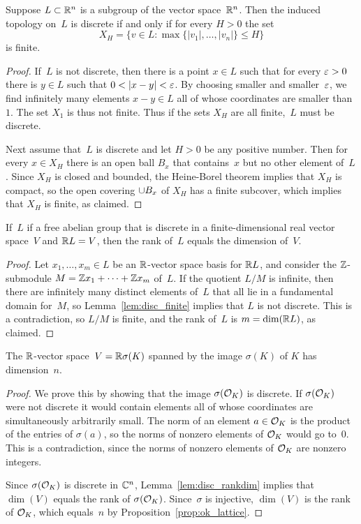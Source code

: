 \begin{lemma}\label{lem:disc_finite}
Suppose $L\subset \mathbb{R}^n$ is a subgroup of the vector space~$\mathbb{R}^n$.
Then the induced topology on~$L$ is discrete if and only
if for every  $H>0$ the set
$$
  X_H = \{v \in L : \max\{|v_1|,\ldots, |v_n|\} \leq H \}
$$
is finite.
\end{lemma}
\begin{proof}
If~$L$ is not discrete, then there is a point $x \in L$ such that
for every $\varepsilon>0$ there is $y\in L$ such that
$0 < |x-y|<\varepsilon$. By choosing smaller and smaller~$\varepsilon$,
we find infinitely many elements $x-y\in L$
all of whose coordinates are smaller than~$1$.
The set $X_1$ is thus not finite.   Thus if the sets
$X_H$ are all finite,~$L$ must be discrete.

Next assume that~$L$ is discrete and let $H>0$ be any positive number.
Then for every $x\in X_H$ there is an open ball $B_x$ that
contains~$x$ but no other element of~$L$.  Since $X_H$ is closed and
bounded, the Heine-Borel theorem implies that $X_H$ is compact, so the
open covering $\cup B_x$ of $X_H$ has a finite subcover, which
implies that $X_H$ is finite, as claimed.
\end{proof}

\begin{lemma}\label{lem:disc_rankdim}
If~$L$ if a free abelian group that is
discrete in a finite-dimensional
real vector space~$V$ and $\mathbb{R}{}L=V$, then the rank of~$L$
equals the dimension of~$V$.
\end{lemma}
\begin{proof}
  Let $x_1,\ldots, x_m \in L$ be an $\mathbb{R}$-vector space basis for
  $\mathbb{R}{}L$, and consider the $\mathbb{Z}$-submodule $M=\mathbb{Z} x_1 + \cdots + \mathbb{Z}
  x_m$ of~$L$.  If the quotient $L/M$ is infinite, then there are
  infinitely many distinct elements of~$L$ that all lie in a
  fundamental domain for~$M$, so Lemma~\ref{lem:disc_finite} implies
  that $L$ is not discrete.  This is a contradiction, so $L/M$ is
  finite, and the rank of~$L$ is $m=\dim(\mathbb{R}{}L)$, as claimed.
\end{proof}

\begin{proposition}
The $\mathbb{R}$-vector space~$V=\mathbb{R}\sigma(K)$ spanned by the image
$\sigma(K)$ of $K$ has dimension~$n$.
\end{proposition}
\begin{proof}
We prove this by showing that the image $\sigma(\mathcal{O}_K)$ is discrete. If
$\sigma(\mathcal{O}_K)$ were not discrete it would contain elements all of
whose coordinates are simultaneously arbitrarily small.  The norm of
an element $a\in \mathcal{O}_K$ is the product of the entries of $\sigma(a)$,
so the norms of nonzero elements of $\mathcal{O}_K$ would go to~$0$.  This is a
contradiction, since the norms of nonzero elements of $\mathcal{O}_K$ are
 nonzero integers.

Since $\sigma(\mathcal{O}_K)$ is discrete in $\mathbb{C}^n$, Lemma~\ref{lem:disc_rankdim}
implies that $\dim(V)$ equals the rank of $\sigma(\mathcal{O}_K)$.  Since~$\sigma$
is injective, $\dim(V)$ is the rank of $\mathcal{O}_K$, which equals~$n$ by
Proposition~\ref{prop:ok_lattice}.
\end{proof}

